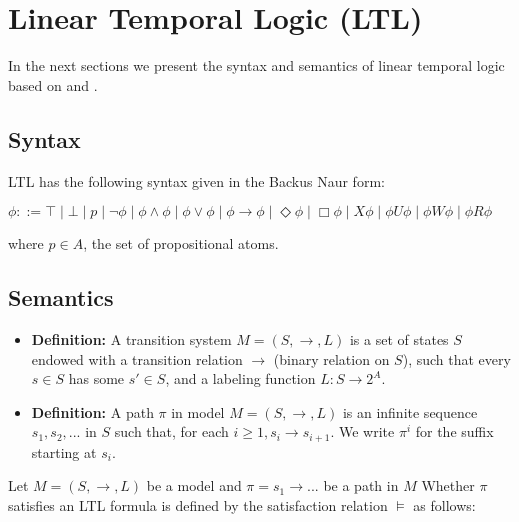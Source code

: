 \chapter{Linear Temporal Logic (LTL)}
\label{ape-ltl}

In the next sections we present the syntax and semantics of linear temporal logic based on \cite{Hauth} and \cite{wikiLTL}.

\section{Syntax}

LTL has the following syntax given in the Backus Naur form:

\begin{center}

$\phi ::= \top \mid \bot \mid p \mid \neg\phi \mid \phi\wedge\phi \mid \phi\vee\phi \mid \phi\rightarrow\phi \mid \Diamond\phi \mid \Box\phi \mid X\phi \mid \phi U \phi \mid \phi W \phi \mid \phi R \phi$

\end{center}

where $p \in A$, the set of propositional atoms.

\section{Semantics}

\begin{itemize}
\item \textbf{Definition:} A transition system $M = (S, \rightarrow, L)$ is a set of states $S$ endowed with a transition relation $\rightarrow$ (binary relation on $S$), such that every $s \in S$ has some $s' \in S$, and a labeling function $L:S \rightarrow 2^A$. 

\item \textbf{Definition:} A path $\pi$ in model $M = (S, \rightarrow, L)$ is an infinite sequence $s_1,s_2,...$ in $S$ such that, for each $i \geq 1, s_i \rightarrow s_{i+1}$. We write $\pi^i$ for the suffix starting at $s_i$.
\end{itemize}

Let $M = (S, \rightarrow, L)$ be a model and $\pi = s_1 \rightarrow ...$ be a path in $M$ Whether $\pi$ satisfies an LTL formula is defined by the satisfaction relation $\models$ as follows:

